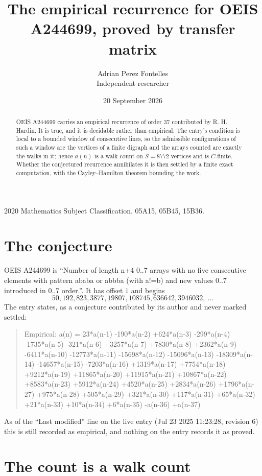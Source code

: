 \documentclass[11pt,a4paper]{article}
\title{The empirical recurrence for OEIS A244699, proved by transfer matrix}
\author{Adrian Perez Fontelles\\ \small Independent researcher}
\date{20 September 2026}
\theoremstyle{plain}
\theoremstyle{definition}
\begin{document}
\maketitle

\begin{abstract}
OEIS A244699 carries an empirical recurrence of order $37$ contributed by R. H. Hardin. It is
true, and it is decidable rather than empirical. The entry's condition is local to a bounded window of consecutive lines, so
the admissible configurations of such a window are the vertices of a finite digraph and the
arrays counted are exactly the walks in it; hence $a(n)$ is a walk count on $S=8772$ vertices
and is $C$-finite. Whether the conjectured recurrence annihilates it is then settled by a
finite exact computation, with the Cayley--Hamilton theorem bounding the work.
\end{abstract}

\noindent\small 2020 Mathematics Subject Classification. 05A15, 05B45, 15B36.\normalsize

\section{The conjecture}

OEIS A244699 is ``Number of length n+4 0..7 arrays with no five consecutive elements with pattern ababa or abbba (with a!=b) and new values 0..7 introduced in 0..7 order.''. It has offset $1$ and begins
\[
50, 192, 823, 3877, 19807, 108745, 636642, 3946032,\ \dots
\]
The entry states, as a conjecture contributed by its author and never marked settled:
\begin{quote}\raggedright\small
Empirical: a(n) = 23*a(n-1) -190*a(n-2) +624*a(n-3) -299*a(n-4) -1735*a(n-5) -321*a(n-6) +3257*a(n-7) +7830*a(n-8) +2362*a(n-9) -6411*a(n-10) -12773*a(n-11) -15698*a(n-12) -15096*a(n-13) -18309*a(n-14) -14657*a(n-15) -7203*a(n-16) +1319*a(n-17) +7754*a(n-18) +9212*a(n-19) +11865*a(n-20) +11915*a(n-21) +10867*a(n-22) +8583*a(n-23) +5912*a(n-24) +4520*a(n-25) +2834*a(n-26) +1796*a(n-27) +975*a(n-28) +505*a(n-29) +321*a(n-30) +117*a(n-31) +65*a(n-32) +21*a(n-33) +10*a(n-34) +6*a(n-35) -a(n-36) +a(n-37)
\end{quote}
As of the ``Last modified'' line on the live entry (Jul 23 2025 11:23:28, revision 6) this is still
recorded as empirical, and nothing on the entry records it as proved.

\section{The count is a walk count}
\end{document}
